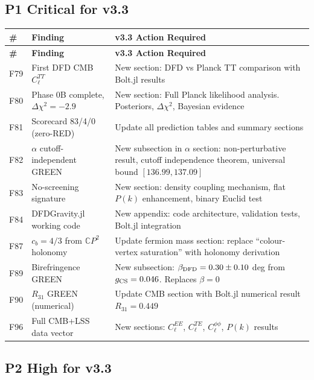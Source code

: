 \documentclass[11pt,a4paper]{article}
\begin{document}
\subsection{P1 Critical for v3.3}

\begin{longtable}{|p{0.6cm}|p{4cm}|p{9cm}|}
\hline
\textbf{\#} & \textbf{Finding} & \textbf{v3.3 Action Required} \\
\hline
\endfirsthead
\hline
\textbf{\#} & \textbf{Finding} & \textbf{v3.3 Action Required} \\
\hline
\endhead

F79 & First DFD CMB $C_\ell^{TT}$ & New section: DFD vs Planck TT comparison with Bolt.jl results \\
\hline
F80 & Phase 0B complete, $\Delta\chi^2 = -2.9$ & New section: Full Planck likelihood analysis. Posteriors, $\Delta\chi^2$, Bayesian evidence \\
\hline
F81 & Scorecard 83/4/0 (zero-RED) & Update all prediction tables and summary sections \\
\hline
F82 & $\alpha$ cutoff-independent GREEN & New subsection in $\alpha$ section: non-perturbative result, cutoff independence theorem, universal bound $[136.99, 137.09]$ \\
\hline
F83 & No-screening signature & New section: density coupling mechanism, flat $P(k)$ enhancement, binary Euclid test \\
\hline
F84 & DFDGravity.jl working code & New appendix: code architecture, validation tests, Bolt.jl integration \\
\hline
F87 & $c_b = 4/3$ from $\mathbb{C}P^2$ holonomy & Update fermion mass section: replace ``colour-vertex saturation'' with holonomy derivation \\
\hline
F89 & Birefringence GREEN & New subsection: $\beta_{\rm DFD} = 0.30 \pm 0.10$ deg from $g_{\rm CS} = 0.046$. Replaces $\beta = 0$ \\
\hline
F90 & $R_{31}$ GREEN (numerical) & Update CMB section with Bolt.jl numerical result $R_{31} = 0.449$ \\
\hline
F96 & Full CMB+LSS data vector & New sections: $C_\ell^{EE}$, $C_\ell^{TE}$, $C_\ell^{\phi\phi}$, $P(k)$ results \\
\hline
\end{longtable}

\subsection{P2 High for v3.3}
\end{document}
